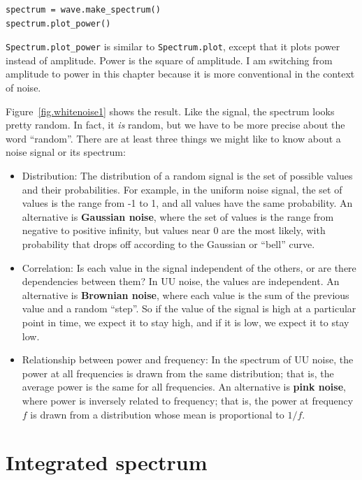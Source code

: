 \documentclass[12pt]{book}
\begin{document}
\begin{verbatim}
spectrum = wave.make_spectrum()
spectrum.plot_power()
\end{verbatim}

\verb"Spectrum.plot_power" is similar to \verb"Spectrum.plot",
except that it plots power instead of amplitude.
Power is the square of amplitude.
I am switching from amplitude to power in this chapter because
it is more conventional in the context of noise.

Figure~\ref{fig.whitenoise1} shows the result.  Like the signal, the
spectrum looks pretty random.  In fact, it {\em is} random, but we have to
be more precise about the word ``random''.  There are at least three
things we might like to know about a noise signal or its spectrum:

\begin{itemize}

\item Distribution: The distribution of a random signal is the set of
  possible values and their probabilities.  For example, in the
  uniform noise signal, the set of values is the range from -1 to 1,
  and all values have the same probability.  An alternative is
  {\bf Gaussian noise}, where the set of values is the range from negative
  to positive infinity, but values near 0 are the most likely, with
  probability that drops off according to the Gaussian or
  ``bell'' curve.

\item Correlation: Is each value in the signal independent of the
  others, or are there dependencies between them?  In UU noise, the
  values are independent.
  An alternative is {\bf Brownian noise}, where each value is the sum
  of the previous value and a random ``step''.  So if the value of the
  signal is high at a particular point in time, we expect it to stay
  high, and if it is low, we expect
  it to stay low.

\item Relationship between power and frequency: In the spectrum of UU
  noise, the power at all frequencies is drawn from the same
  distribution; that is, the average power is the same for all
  frequencies.  An alternative is {\bf pink noise}, where power is
  inversely related to frequency; that is, the power at frequency $f$
  is drawn from a distribution whose mean is proportional to $1/f$.

\end{itemize}


\section{Integrated spectrum}
\end{document}
